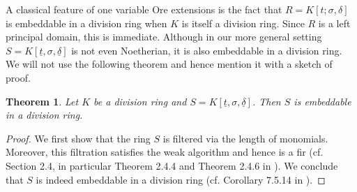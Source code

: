 \documentclass[12pt,a4paper]{article}
\newtheorem{theorem}{Theorem}[section]
\newcommand{\ut}{\underline{t}}
\newcommand{\ud}{\underline{\delta}}
\begin{document}
\vspace{5mm}

A classical feature of one variable Ore extensions is the fact that $R=K[t;\sigma,\delta]$ is embeddable in a division ring when $K$ is itself a division ring.
Since $R$ is a left principal domain, this is immediate.   Although in our more general setting $S=K[\ut,\sigma,\ud]$ is not even Noetherian, it is also embeddable in a division ring.  We will not use the following theorem and hence mention it with a sketch of proof. 
\begin{theorem}
	Let $K$ be a division ring and $S=K[\ut,\sigma,\ud]$.  Then $S$ is embeddable in a division ring. 
\end{theorem}
\begin{proof}
	We first show that the ring $S$ is filtered via the length of monomials.  Moreover, this filtration satisfies the weak algorithm and hence is a fir (cf. Section 2.4, in particular Theorem 2.4.4 and Theorem 2.4.6 in \cite{PMC}).  We conclude that $S$ is indeed embeddable in a division ring (cf. Corollary 7.5.14 in \cite{PMC}). 
\end{proof}
\end{document}
